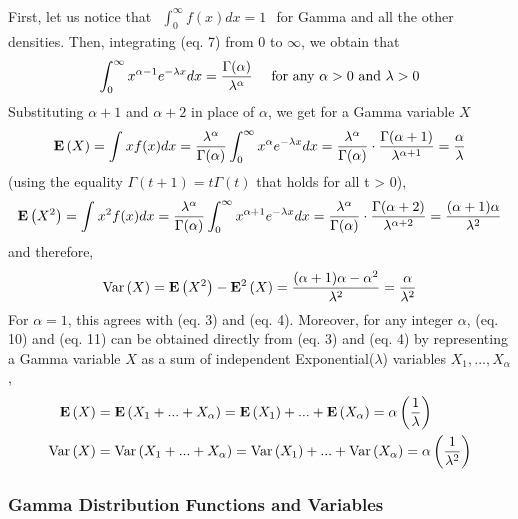 First, let us notice that $\begin{aligned}\int_{0}^{\infty} f(x)dx = 1\end{aligned}$ for Gamma and all the other densities. Then, integrating (eq. 7) from $0$ to $\infty$, we obtain that
\begin{equation}
    \int_{0}^{\infty} x^{\alpha-1}e^{-\lambda x} dx = \frac{\Gamma(\alpha)}{\lambda^{\alpha}}\ \ \ \ \textnormal{for any $\alpha > 0$ and $\lambda > 0$}
\end{equation}
Substituting $\alpha + 1$ and $\alpha + 2$ in place of $\alpha$, we get for a Gamma variable $X$
\begin{equation}
    \mathbf{E}\left(X\right) = \int_{}^{} xf(x)dx = \frac{\lambda^{\alpha}}{\Gamma(\alpha)} \int_{0}^{\infty} x^{\alpha} e^{-\lambda x} dx = \frac{\lambda^{\alpha}}{\Gamma(\alpha)} \cdot \frac{\Gamma(\alpha+1)}{\lambda^{\alpha+1}} = \frac{\alpha}{\lambda}
\end{equation}
(using the equality $\Gamma(t + 1) = t \Gamma(t)$ that holds for all t > 0),
\begin{equation*}
    \mathbf{E}\left(X^2\right) = \int_{}^{} x^2f(x)dx = \frac{\lambda^{\alpha}}{\Gamma(\alpha)} \int_{0}^{\infty} x^{\alpha+1} e^{-\lambda x} dx = \frac{\lambda^{\alpha}}{\Gamma(\alpha)} \cdot \frac{\Gamma(\alpha+2)}{\lambda^{\alpha+2}} = \frac{(\alpha + 1) \alpha}{\lambda^2}
\end{equation*}
and therefore,
\begin{equation}
    \text{Var}\left( X \right) = \mathbf{E}\left(X^2\right) - \mathbf{E}^2\left(X\right) = \frac{(\alpha+1)\alpha - \alpha^2}{\lambda^2} = \frac{\alpha}{\lambda^2}
\end{equation}
For $\alpha = 1$, this agrees with (eq. 3) and (eq. 4). Moreover, for any integer $\alpha$, (eq. 10) and (eq. 11) can be obtained directly from (eq. 3) and (eq. 4) by representing a Gamma variable $X$ as a sum of independent Exponential($\lambda$) variables $X_1, ..., X_{\alpha}$,
\begin{align*}
    \mathbf{E}\left(X\right) &= \mathbf{E}\left(X_1 + ... + X_{\alpha}\right) = \mathbf{E}\left(X_1\right) + ... + \mathbf{E}\left(X_{\alpha}\right) = \alpha \left( \frac{1}{\lambda} \right)\\
    \text{Var}\left( X \right) &= \text{Var}\left( X_1 + ... + X_{\alpha} \right) = \text{Var}\left( X_1 \right) + ... + \text{Var}\left( X_{\alpha} \right) = \alpha \left( \frac{1}{\lambda^2} \right)\\
\end{align*}

\subsubsection{Gamma Distribution Functions and Variables}


